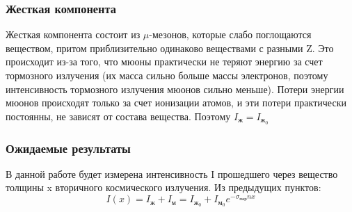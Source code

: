 \documentclass[a4paper,12pt]{article} %
\begin{document}
\subsubsection{Жесткая компонента}
Жесткая компонента состоит из $\mu$-мезонов, которые слабо поглощаются веществом, притом приблизительно одинаково веществами с разными Z. Это происходит из-за того, что мюоны практически не теряют энергию за счет тормозного излучения (их масса сильно больше массы электронов, поэтому интенсивность тормозного излучения мюонов сильно меньше). Потери энергии мюонов происходят только за счет ионизации атомов, и эти потери практически постоянны, не зависят от состава вещества. Поэтому $\boxed{I_{\text{ж}} = I_{\text{ж}_0}}$ 

\subsubsection{Ожидаемые результаты}
В данной работе будет измерена интенсивность I прошедшего через вещество толщины x вторичного космического излучения. Из предыдущих пунктов:
\begin{equation} \label{!!!}
    \boxed{I(x) = I_{\text{ж}} + I_{\text{м}} = I_{\text{ж}_0} + I_{\text{м}_0} e^{-\sigma_{\text{пар}}nx}}
\end{equation}
\end{document}
